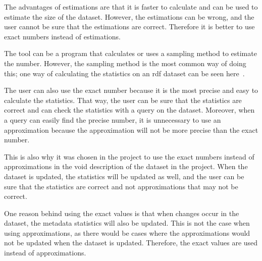 The advantages of estimations are that it is faster to calculate and can be used to estimate the size of the dataset. However, the estimations can be wrong, and the user cannot be sure that the estimations are correct. Therefore it is better to use exact numbers instead of estimations.

The tool can be a program that calculates or uses a sampling method to estimate the number. However, the sampling method is the most common way of doing this; one way of calculating the statistics on an \gls{rdf} dataset can be seen here~\cite{zneika2016rdf}.

The user can also use the exact number because it is the most precise and easy to calculate the statistics. That way, the user can be sure that the statistics are correct and can check the statistics with a query on the dataset. Moreover, when a query can easily find the precise number, it is unnecessary to use an approximation because the approximation will not be more precise than the exact number.

This is also why it was chosen in the project to use the exact numbers instead of approximations in the \gls{void} description of the dataset in the project. When the dataset is updated, the statistics will be updated as well, and the user can be sure that the statistics are correct and not approximations that may not be correct.

One reason behind using the exact values is that when changes occur in the dataset, the metadata statistics will also be updated. This is not the case when using approximations, as there would be cases where the approximations would not be updated when the dataset is updated. Therefore, the exact values are used instead of approximations.




